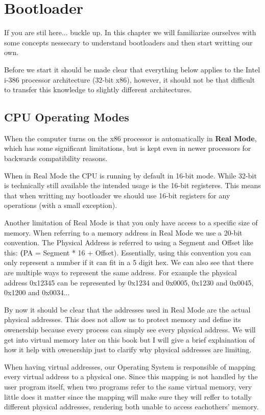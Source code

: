 \chapter{Bootloader}

If you are stil here... buckle up. In this chapter we will familiarize ourselves with some concepts nessecary to understand bootloaders
and then start writting our own.

Before we start it should be made clear that everything below applies to the Intel i-386 processor architecture (32-bit x86), however, it should not
be that difficult to transfer this knowledge to slightly different architectures.

\section{CPU Operating Modes}

When the computer turns on the x86 processor is automatically in \textbf{Real Mode}, which has some significant limitations, but is
kept even in newer processors for backwards compatibility reasons. 

When in Real Mode the CPU is running by default in 16-bit mode. While 32-bit is technically still available the intended usage is the
16-bit registeres. This means that when writting my bootloader we should use 16-bit registers for any operations (with a small exception).

Another limitation of Real Mode is that you only have access to a specific size of memory. When referring to a memory address in Real Mode
we use a 20-bit convention. The Physical Address is referred to using a Segment and Offset like this: \textbf(PA = Segment * 16 + Offset).
Essentially, using this convention you can only represent a number if it can fit in a 5 digit hex. We can also see that there are multiple
ways to represent the same address. For example the physical address 0x12345 can be represented by 0x1234 and 0x0005, 0x1230 and 0x0045,
0x1200 and 0x0034... 

By now it should be clear that the addresses used in Real Mode are the actual physical addresses. This does not allow us to protect 
memory and define its owenership because every process can simply see every physical address. We will get into virtual memory later
on this book but I will give a brief explaination of how it help with owenership just to clarify why physical addresses are limiting.

When having virtual addresses, our Operating System is responsible of mapping every virtual address to a physical one. Since this 
mapping is not handled by the user program itself, when two programs refer to the same virtual memory, very little does it matter
since the mapping will make sure they will reffer to totally different physical addresses, rendering both unable to access eachothers'
memory.